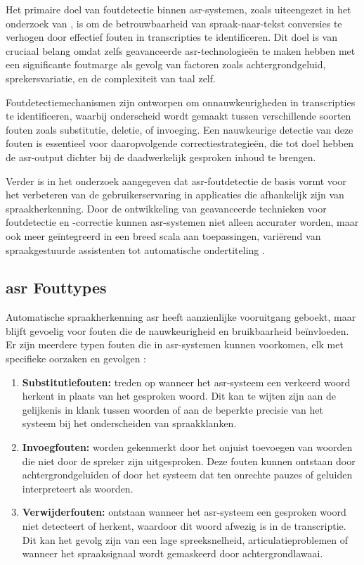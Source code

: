 Het primaire doel van foutdetectie binnen \gls{asr}-systemen, zoals uiteengezet in het onderzoek van \textcite{jiang2005confidence}, is om de betrouwbaarheid van spraak-naar-tekst conversies te verhogen door effectief fouten in transcripties te identificeren. Dit doel is van cruciaal belang omdat zelfs geavanceerde \gls{asr}-technologieën te maken hebben met een significante foutmarge als gevolg van factoren zoals achtergrondgeluid, sprekersvariatie, en de complexiteit van taal zelf.

Foutdetectiemechanismen zijn ontworpen om onnauwkeurigheden in transcripties te identificeren, waarbij onderscheid wordt gemaakt tussen verschillende soorten fouten zoals substitutie, deletie, of invoeging. Een nauwkeurige detectie van deze fouten is essentieel voor daaropvolgende correctiestrategieën, die tot doel hebben de \gls{asr}-output dichter bij de daadwerkelijk gesproken inhoud te brengen.

Verder is in het onderzoek aangegeven dat \gls{asr}-foutdetectie de basis vormt voor het verbeteren van de gebruikerservaring in applicaties die afhankelijk zijn van spraakherkenning. Door de ontwikkeling van geavanceerde technieken voor foutdetectie en -correctie kunnen \gls{asr}-systemen niet alleen accurater worden, maar ook meer geïntegreerd in een breed scala aan toepassingen, variërend van spraakgestuurde assistenten tot automatische ondertiteling \autocite{jiang2005confidence}.

\subsection{\gls{asr} Fouttypes}
Automatische spraakherkenning \gls{asr} heeft aanzienlijke vooruitgang geboekt, maar blijft gevoelig voor fouten die de nauwkeurigheid en bruikbaarheid beïnvloeden. Er zijn meerdere typen fouten die in \gls{asr}-systemen kunnen voorkomen, elk met specifieke oorzaken en gevolgen \autocite{Errattahi_2018}: 

\begin{enumerate}[label=\arabic*.]
    \item \textbf{Substitutiefouten:}
    treden op wanneer het \gls{asr}-systeem een verkeerd woord herkent in plaats van het gesproken woord. Dit kan te wijten zijn aan de gelijkenis in klank tussen woorden of aan de beperkte precisie van het systeem bij het onderscheiden van spraakklanken.
    
    \item \textbf{Invoegfouten:}
    worden gekenmerkt door het onjuist toevoegen van woorden die niet door de spreker zijn uitgesproken. Deze fouten kunnen ontstaan door achtergrondgeluiden of door het systeem dat ten onrechte pauzes of geluiden interpreteert als woorden.
    
    \item \textbf{Verwijderfouten:}
    ontstaan wanneer het \gls{asr}-systeem een gesproken woord niet detecteert of herkent, waardoor dit woord afwezig is in de transcriptie. Dit kan het gevolg zijn van een lage spreeksnelheid, articulatieproblemen of wanneer het spraaksignaal wordt gemaskeerd door achtergrondlawaai.   
\end{enumerate}

